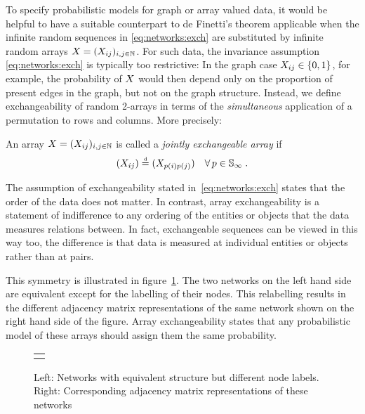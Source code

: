 To specify probabilistic models for graph or array valued data, it would be helpful to have a suitable counterpart to de Finetti's theorem applicable when the infinite random sequences in \eqref{eq:networks:exch} are substituted by infinite random arrays $X=(X_{ij})_{i,j\in\mathbb{N}}$.
For such data, the invariance assumption \eqref{eq:networks:exch} is typically too restrictive: In the graph case $X_{ij}\in\lbrace 0,1\rbrace$, for example, the probability of $X$ would then depend only on the proportion of present edges in the graph, but not on the graph structure.
Instead, we define exchangeability of random 2-arrays in terms of the \emph{simultaneous} application of a permutation to rows and columns.
More precisely:
\begin{definition}
  An array $X=(X_{ij})_{i,j\in\mathbb{N}}$ is called a \emph{jointly exchangeable array} if 
  \begin{equation}
    \label{eq:jointly:ex}
    (X_{ij})\stackrel{\mbox{\tiny d}}{=}(X_{p(i)p(j)}) \quad \forall \, p\in\mathbb{S}_{\infty}\;.
  \end{equation}
\end{definition}

The assumption of exchangeability stated in~\eqref{eq:networks:exch} states that the order of the data does not matter.
In contrast, array exchangeability is a statement of indifference to any ordering of the entities or objects that the data measures relations between.
In fact, exchangeable sequences can be viewed in this way too, the difference is that data is measured at individual entities or objects rather than at pairs.

This symmetry is illustrated in figure~\ref{fig:networks:exchangeable}.
The two networks on the left hand side are equivalent except for the labelling of their nodes.
This relabelling results in the different adjacency matrix representations of the same network shown on the right hand side of the figure.
Array exchangeability states that any probabilistic model of these arrays should assign them the same probability.

\begin{figure}[ht]
\centering
\begin{tabular}{c}
\tiny 
\end{tabular}
\caption[Illustration of array exchangeability for network adjacency matrices.]{Left: Networks with equivalent structure but different node labels. Right: Corresponding adjacency matrix representations of these networks}
\label{fig:networks:exchangeable}
\end{figure}

